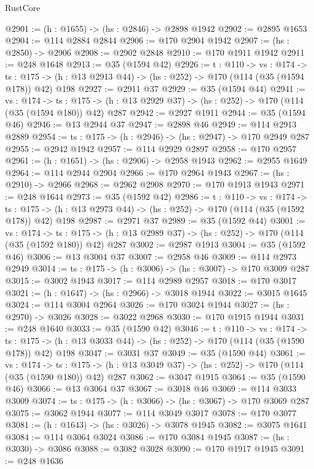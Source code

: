 \begin{lexlean}{RustCore}
\begin{coremodule}
@2901 := (h : @1655) -> (hs : @2846) -> @2898 @1942
@2902 := @2895 @1653
@2904 := @114 @2884 @2844
@2906 := @170 @2904 @1942
@2907 := (hs : @2850) -> @2906
@2908 := @2902 @2848
@2910 := @170 @1911 @1942
@2911 := @248 @1648
@2913 := @35 (@1594 @42)
@2926 := {t : @110} ->
  {vs : @174} ->
  {ts : @175} -> (h : @13 @2913 @44) -> (hs : @252) -> @170 (@114 (@35 (@1594 @178)) @42) @198
@2927 := @2911 @37
@2929 := @35 (@1594 @44)
@2941 := {vs : @174} ->
  {ts : @175} -> (h : @13 @2929 @37) -> (hs : @252) -> @170 (@114 (@35 (@1594 @180)) @42) @287
@2942 := @2927 @1911
@2944 := @35 (@1594 @46)
@2946 := @13 @2944 @37
@2947 := @2898 @46
@2949 := @114 @2913 @2889
@2954 := {ts : @175} -> (h : @2946) -> (hs : @2947) -> @170 @2949 @287
@2955 := @2942 @1942
@2957 := @114 @2929 @2897
@2958 := @170 @2957
@2961 := (h : @1651) -> (hs : @2906) -> @2958 @1943
@2962 := @2955 @1649
@2964 := @114 @2944 @2904
@2966 := @170 @2964 @1943
@2967 := (hs : @2910) -> @2966
@2968 := @2962 @2908
@2970 := @170 @1913 @1943
@2971 := @248 @1644
@2973 := @35 (@1592 @42)
@2986 := {t : @110} ->
  {vs : @174} ->
  {ts : @175} -> (h : @13 @2973 @44) -> (hs : @252) -> @170 (@114 (@35 (@1592 @178)) @42) @198
@2987 := @2971 @37
@2989 := @35 (@1592 @44)
@3001 := {vs : @174} ->
  {ts : @175} -> (h : @13 @2989 @37) -> (hs : @252) -> @170 (@114 (@35 (@1592 @180)) @42) @287
@3002 := @2987 @1913
@3004 := @35 (@1592 @46)
@3006 := @13 @3004 @37
@3007 := @2958 @46
@3009 := @114 @2973 @2949
@3014 := {ts : @175} -> (h : @3006) -> (hs : @3007) -> @170 @3009 @287
@3015 := @3002 @1943
@3017 := @114 @2989 @2957
@3018 := @170 @3017
@3021 := (h : @1647) -> (hs : @2966) -> @3018 @1944
@3022 := @3015 @1645
@3024 := @114 @3004 @2964
@3026 := @170 @3024 @1944
@3027 := (hs : @2970) -> @3026
@3028 := @3022 @2968
@3030 := @170 @1915 @1944
@3031 := @248 @1640
@3033 := @35 (@1590 @42)
@3046 := {t : @110} ->
  {vs : @174} ->
  {ts : @175} -> (h : @13 @3033 @44) -> (hs : @252) -> @170 (@114 (@35 (@1590 @178)) @42) @198
@3047 := @3031 @37
@3049 := @35 (@1590 @44)
@3061 := {vs : @174} ->
  {ts : @175} -> (h : @13 @3049 @37) -> (hs : @252) -> @170 (@114 (@35 (@1590 @180)) @42) @287
@3062 := @3047 @1915
@3064 := @35 (@1590 @46)
@3066 := @13 @3064 @37
@3067 := @3018 @46
@3069 := @114 @3033 @3009
@3074 := {ts : @175} -> (h : @3066) -> (hs : @3067) -> @170 @3069 @287
@3075 := @3062 @1944
@3077 := @114 @3049 @3017
@3078 := @170 @3077
@3081 := (h : @1643) -> (hs : @3026) -> @3078 @1945
@3082 := @3075 @1641
@3084 := @114 @3064 @3024
@3086 := @170 @3084 @1945
@3087 := (hs : @3030) -> @3086
@3088 := @3082 @3028
@3090 := @170 @1917 @1945
@3091 := @248 @1636

\end{coremodule}
\end{lexlean}
